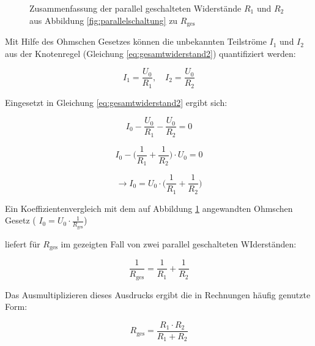 \begin{frame}
{\begin{figure}[h!]
\begin{center}
				
				
			\end{center}
			\caption{Zusammenfassung der parallel geschalteten Widerstände $R_1$ und $R_2$ aus Abbildung \ref{fig:parallelschaltung} zu $R_\mathrm{ges}$}
			\label{fig:parallelzusammen}
		\end{figure}
		
		Mit Hilfe des Ohmschen Gesetzes können die unbekannten Teilströme $I_1$ und $I_2$ aus der Knotenregel (Gleichung \ref{eq:gesamtwiderstand2}) quantifiziert werden:
		
		\begin{equation*}
			I_1 = \frac{U_0}{R_1}, \quad I_2 = \frac{U_0}{R_2}
		\end{equation*}
		
		Eingesetzt in Gleichung \ref{eq:gesamtwiderstand2} ergibt sich:
		
		
		
		\begin{equation*}
			I_0 - \frac{U_0}{R_1} - \frac{U_0}{R_2} = 0
		\end{equation*}
		
		
		\begin{equation*}
			I_0 - \bigg( \frac{1}{R_1}+\frac{1}{R_2} \bigg) \cdot U_0 = 0
		\end{equation*}
		
		\begin{equation*}
			\rightarrow I_0 = U_0 \cdot  \bigg( \frac{1}{R_1}+\frac{1}{R_2} \bigg)
		\end{equation*}
		
		
		Ein Koeffizientenvergleich mit dem auf Abbildung \ref{fig:parallelzusammen} angewandten Ohmschen Gesetz 
		( $I_0 = U_0 \cdot \frac{1}{R_\mathrm{ges}}$)
		
		liefert für $R_\mathrm{ges}$ im gezeigten Fall von zwei parallel geschalteten WIderständen:
		
		\begin{equation*}
			\frac{1}{R_\mathrm{ges}} =  \frac{1}{R_1}+\frac{1}{R_2}
		\end{equation*}
		
		Das Ausmultiplizieren dieses Ausdrucks ergibt die in Rechnungen häufig genutzte Form:
		
		\begin{equation}
			R_\mathrm{ges} = \frac{R_1\cdot R_2}{R_1 + R_2}
			\label{eq:r2parallel}
		\end{equation}
		
}
\end{frame}
